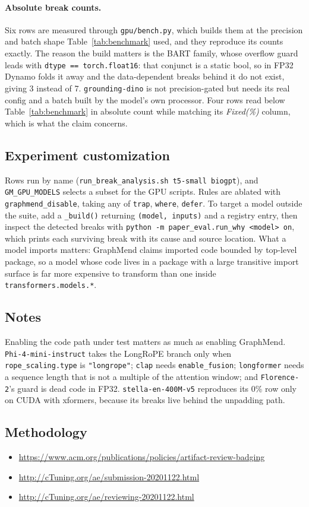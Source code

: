 \paragraph{Absolute break counts.} Six rows are measured through
\texttt{gpu/bench.py}, which builds them at the precision and batch shape
Table~\ref{tab:benchmark} used, and they reproduce its counts exactly. The
reason the build matters is the BART family, whose overflow guard leads with
\texttt{dtype == torch.float16}: that conjunct is a static bool, so in FP32
Dynamo folds it away and the data-dependent breaks behind it do not exist,
giving 3 instead of 7. \texttt{grounding-dino} is not precision-gated but needs
its real config and a batch built by the model's own processor. Four rows read
below Table~\ref{tab:benchmark} in absolute count while matching its
\emph{Fixed(\%)} column, which is what the claim concerns.

\subsection{Experiment customization}

Rows run by name (\texttt{run\_break\_analysis.sh t5-small biogpt}), and
\texttt{GM\_GPU\_MODELS} selects a subset for the GPU scripts. Rules are ablated
with \texttt{graphmend\_disable}, taking any of \texttt{trap}, \texttt{where},
\texttt{defer}. To target a model outside the suite, add a \texttt{\_build()}
returning \texttt{(model, inputs)} and a registry entry, then inspect the
detected breaks with \texttt{python -m paper\_eval.run\_why <model> on}, which
prints each surviving break with its cause and source location. What a model
imports matters: GraphMend claims imported code bounded by top-level package,
so a model whose code lives in a package with a large transitive import surface
is far more expensive to transform than one inside
\texttt{transformers.models.*}.

\subsection{Notes}

Enabling the code path under test matters as much as enabling GraphMend.
\texttt{Phi-4-mini-instruct} takes the LongRoPE branch only when
\texttt{rope\_scaling.type} is \texttt{"longrope"}; \texttt{clap} needs
\texttt{enable\_fusion}; \texttt{longformer} needs a sequence length that is not
a multiple of the attention window; and \texttt{Florence-2}'s guard is dead code
in FP32. \texttt{stella-en-400M-v5} reproduces its 0\% row only on CUDA with
xformers, because its breaks live behind the unpadding path.

\subsection{Methodology}

\begin{itemize}\itemsep0pt
  \item \url{https://www.acm.org/publications/policies/artifact-review-badging}
  \item \url{http://cTuning.org/ae/submission-20201122.html}
  \item \url{http://cTuning.org/ae/reviewing-20201122.html}
\end{itemize}
